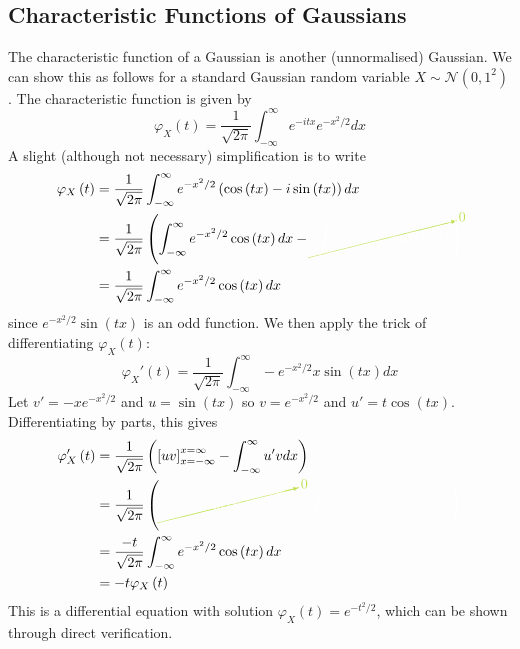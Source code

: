 \documentclass[11pt]{report} %
\begin{document}
\subsection{Characteristic Functions of Gaussians}

The characteristic function of a Gaussian is another (unnormalised) Gaussian. We can show this as follows for a standard Gaussian random variable $X \sim \mathcal{N}\left(0, 1^{2}\right)$. The characteristic function is given by
\begin{equation}
\varphi_{X}\left(t\right) = \dfrac{1}{\sqrt{2\pi}}\int_{-\infty}^{\infty}e^{-itx}e^{-x^{2}/2}dx
\end{equation}
A slight (although not necessary) simplification is to write
\begin{align}
\varphi_{X}\left(t\right) &= \dfrac{1}{\sqrt{2\pi}}\int_{-\infty}^{\infty}e^{-x^{2}/2}\left(\cos\left(tx\right) - i\sin\left(tx\right)\right)dx \\
&= \dfrac{1}{\sqrt{2\pi}}\left(\int_{-\infty}^{\infty}e^{-x^{2}/2}\cos\left(tx\right)dx - \green\cancelto{0}{\black i\int_{-\infty}^{\infty}e^{-x^{2}/2}\sin\left(tx\right)dx}\black\right) \\
&= \dfrac{1}{\sqrt{2\pi}}\int_{-\infty}^{\infty}e^{-x^{2}/2}\cos\left(tx\right)dx
\end{align}
since $e^{-x^{2}/2}\sin\left(tx\right)$ is an odd function. We then apply the trick of differentiating $\varphi_{X}\left(t\right)$:
\begin{equation}
\varphi_{X}'\left(t\right) = \dfrac{1}{\sqrt{2\pi}}\int_{-\infty}^{\infty}-e^{-x^{2}/2}x\sin\left(tx\right)dx
\end{equation}
Let $v' = -xe^{-x^{2}/2}$ and $u = \sin\left(tx\right)$ so $v = e^{-x^{2}/2}$ and $u' = t\cos\left(tx\right)$. Differentiating by parts, this gives
\begin{align}
\varphi_{X}'\left(t\right) &= \dfrac{1}{\sqrt{2\pi}}\left(\left[uv\right]_{x = -\infty}^{x = \infty} - \int_{-\infty}^{\infty}u'vdx\right) \\
&= \dfrac{1}{\sqrt{2\pi}}\left(\green\cancelto{0}{\black\left[e^{-x^{2}/2}\sin\left(tx\right)\right]_{x = -\infty}^{x = \infty}}\black - \int_{-\infty}^{\infty}t\cos\left(tx\right)e^{-x^{2}/2}dx\right) \\
&=  \dfrac{-t}{\sqrt{2\pi}}\int_{-\infty}^{\infty}e^{-x^{2}/2}\cos\left(tx\right)dx \\
&= -t\varphi_{X}\left(t\right)
\end{align}
This is a differential equation with solution $\varphi_{X}\left(t\right) = e^{-t^{2}/2}$, which can be shown through direct verification.
\end{document}
